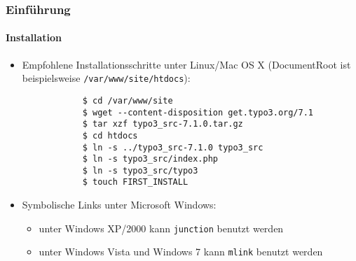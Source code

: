 \begin{frame}[fragile]
	\frametitle{Einführung}
	\framesubtitle{Installation}

	\begin{itemize}
		\item Empfohlene Installationsschritte unter Linux/Mac OS X\newline
			(DocumentRoot ist beispielsweise \texttt{/var/www/site/htdocs}):
		\begin{lstlisting}
			$ cd /var/www/site
			$ wget --content-disposition get.typo3.org/7.1
			$ tar xzf typo3_src-7.1.0.tar.gz
			$ cd htdocs
			$ ln -s ../typo3_src-7.1.0 typo3_src
			$ ln -s typo3_src/index.php
			$ ln -s typo3_src/typo3
			$ touch FIRST_INSTALL
		\end{lstlisting}

		\item Symbolische Links unter Microsoft Windows:

			\begin{itemize}
				\item unter Windows XP/2000 kann \texttt{junction} benutzt werden
				\item unter Windows Vista und Windows 7 kann \texttt{mlink} benutzt werden
			\end{itemize}

	\end{itemize}
\end{frame}


